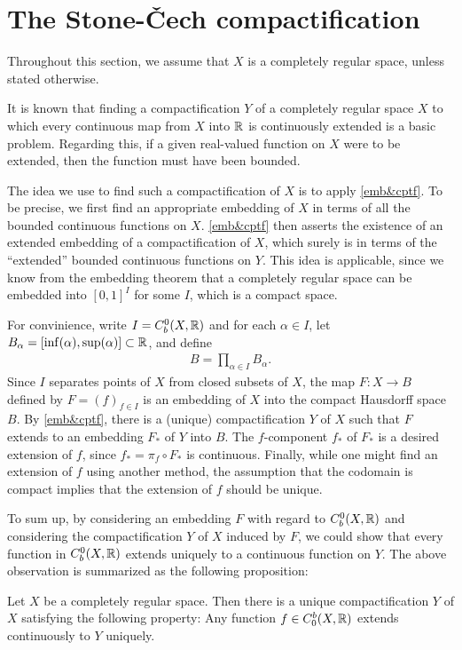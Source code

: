 \section{The Stone-\v{C}ech compactification}

Throughout this section, we assume that $X$ is a completely regular space, unless stated otherwise.

It is known that finding a compactification $Y$ of a completely regular space $X$ to which every continuous map from $X$ into ${\mathbb{R}}$ is continuously extended is a basic problem.
Regarding this, if a given real-valued function on $X$ were to be extended, then the function must have been bounded.

The idea we use to find such a compactification of $X$ is to apply \cref{emb&cptf}.
To be precise, we first find an appropriate embedding of $X$ in terms of all the bounded continuous functions on $X$.
\cref{emb&cptf} then asserts the existence of an extended embedding of a compactification of $X$, which surely is in terms of the ``extended'' bounded continuous functions on $Y$.
This idea is applicable, since we know from the embedding theorem that a completely regular space can be embedded into $[0, 1]^I$ for some $I$, which is a compact space.

For convinience, write $I=C_b^0(X, {\mathbb{R}})$ and for each $\alpha\in I$, let $B_\alpha=[\inf(\alpha), \sup(\alpha)]\subset{\mathbb{R}}$, and define
\begin{align*}
    B=\prod_{\alpha\in I}B_\alpha.
\end{align*}
Since $I$ separates points of $X$ from closed subsets of $X$, the map $F: X\rightarrow B$ defined by $F=(f)_{f\in I}$ is an embedding of $X$ into the compact Hausdorff space $B$.
By \cref{emb&cptf}, there is a (unique) compactification $Y$ of $X$ such that $F$ extends to an embedding $F_*$ of $Y$ into $B$.
The $f$-component $f_*$ of $F_*$ is a desired extension of $f$, since $f_*=\pi_f\circ F_*$ is continuous.
Finally, while one might find an extension of $f$ using another method, the assumption that the codomain is compact implies that the extension of $f$ should be unique.

To sum up, by considering an embedding $F$ with regard to $C_b^0(X, {\mathbb{R}})$ and considering the compactification $Y$ of $X$ induced by $F$, we could show that every function in $C_b^0(X, {\mathbb{R}})$ extends uniquely to a continuous function on $Y$.
The above observation is summarized as the following proposition:
\begin{prop}\label{SC-cptf_ver1}
    Let $X$ be a completely regular space.
    Then there is a unique compactification $Y$ of $X$ satisfying the following property:
    Any function $f\in C_0^b(X, {\mathbb{R}})$ extends continuously to $Y$ uniquely.
\end{prop}

